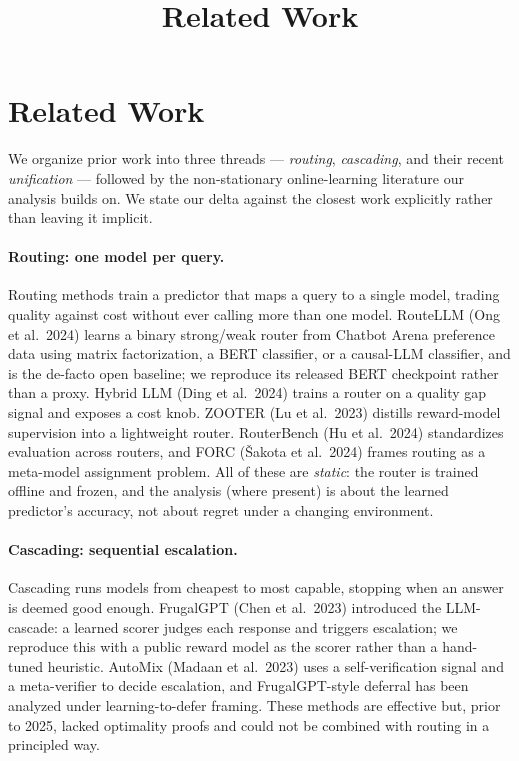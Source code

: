 \documentclass[11pt]{article}
\title{Related Work}
\author{}
\date{}
\begin{document}
\maketitle

\section{Related Work}
\label{sec:related}

We organize prior work into three threads --- \emph{routing}, \emph{cascading},
and their recent \emph{unification} --- followed by the non-stationary
online-learning literature our analysis builds on. We state our delta against
the closest work explicitly rather than leaving it implicit.

\paragraph{Routing: one model per query.}
Routing methods train a predictor that maps a query to a single model, trading
quality against cost without ever calling more than one model. RouteLLM
(Ong et al.\ 2024) learns a binary strong/weak router from Chatbot Arena
preference data using matrix factorization, a BERT classifier, or a causal-LLM
classifier, and is the de-facto open baseline; we reproduce its released BERT
checkpoint rather than a proxy. Hybrid LLM (Ding et al.\ 2024) trains a router
on a quality gap signal and exposes a cost knob. ZOOTER (Lu et al.\ 2023)
distills reward-model supervision into a lightweight router. RouterBench
(Hu et al.\ 2024) standardizes evaluation across routers, and FORC
(\v{S}akota et al.\ 2024) frames routing as a meta-model assignment problem.
All of these are \emph{static}: the router is trained offline and frozen, and
the analysis (where present) is about the learned predictor's accuracy, not
about regret under a changing environment.

\paragraph{Cascading: sequential escalation.}
Cascading runs models from cheapest to most capable, stopping when an answer is
deemed good enough. FrugalGPT (Chen et al.\ 2023) introduced the LLM-cascade:
a learned scorer judges each response and triggers escalation; we reproduce
this with a public reward model as the scorer rather than a hand-tuned
heuristic. AutoMix (Madaan et al.\ 2023) uses a self-verification signal and a
meta-verifier to decide escalation, and FrugalGPT-style deferral has been
analyzed under learning-to-defer framing. These methods are effective but,
prior to 2025, lacked optimality proofs and could not be combined with routing
in a principled way.
\end{document}
